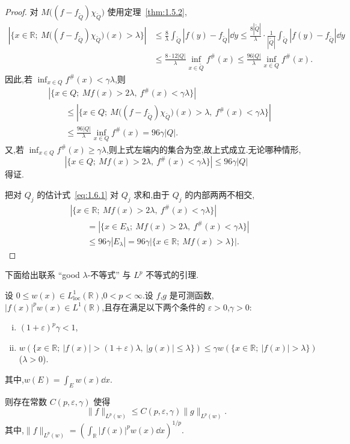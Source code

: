 \begin{proof}
对 $M\bigl((f - f_{\tilde{Q}})\chi_{\tilde{Q}}\bigr)$ 使用定理~\ref{thm:1.5.2},
\begin{align*}
|\{x \in \mathbb{R};\ M\bigl((f - f_{\tilde{Q}})\chi_{\tilde{Q}}\bigr)(x) > \lambda\}|&\leq \frac{8}{\lambda}\int_{\tilde{Q}}|f(y) - f_{\tilde{Q}}|\dd y \leq \frac{8|\tilde{Q}|}{\lambda}\cdot\frac{1}{|\tilde{Q}|}\int_{\tilde{Q}}|f(y) - f_{\tilde{Q}}|\dd y  \\
&\leq \frac{8\cdot 12|Q|}{\lambda}\inf_{x \in \tilde{Q}}f^{\#}(x) \leq \frac{96|Q|}{\lambda}\inf_{x \in Q}f^{\#}(x).
\end{align*}
因此,若 $\inf_{x \in Q}f^{\#}(x) < \gamma\lambda$,则
\begin{align*}
& |\{x \in Q;\ Mf(x) > 2\lambda,\ f^{\#}(x) < \gamma\lambda\}| \\
& \qquad \leq |\{x \in Q;\ M\bigl((f - f_{\tilde{Q}})\chi_{\tilde{Q}}\bigr)(x) > \lambda,\ f^{\#}(x) < \gamma\lambda\}| \\
& \qquad \leq \frac{96|Q|}{\lambda}\inf_{x \in Q}f^{\#}(x) = 96\gamma|Q|.
\end{align*}
又,若 $\inf_{x \in Q}f^{\#}(x) \geq \gamma\lambda$,则上式左端内的集合为空,故上式成立.无论哪种情形,
\begin{equation}\tag{1.6.1}
\left|\{x \in Q;\ Mf(x) > 2\lambda,\ f^{\#}(x) < \gamma\lambda\}\right| \leq 96\gamma|Q|
\label{eq:1.6.1}\end{equation}
得证.

把对 $Q_{j}$ 的估计式~\eqref{eq:1.6.1} 对 $Q_{j}$ 求和,由于 $Q_{j}$ 的内部两两不相交,
\begin{align*}
& |\{x \in \mathbb{R};\ Mf(x) > 2\lambda,\ f^{\#}(x) < \gamma\lambda\}| \\
& \qquad = |\{x \in E_{\lambda};\ Mf(x) > 2\lambda,\ f^{\#}(x) < \gamma\lambda\}| \\
& \qquad \leq 96\gamma|E_{\lambda}| = 96\gamma|\{x \in \mathbb{R};\ Mf(x) > \lambda\}|.
\end{align*}
\end{proof}

下面给出联系 ``good $\lambda$-不等式'' 与 $L^{p}$ 不等式的引理.

\begin{lemma}\label{lem:1.6.6}
设 $0 \leq w(x) \in L_{\mathrm{loc}}^{1}(\mathbb{R})$,$0 < p < \infty$.设 $f$,$g$ 是可测函数,$|f(x)|^{p}w(x) \in L^{1}(\mathbb{R})$,且存在满足以下两个条件的 $\varepsilon > 0$,$\gamma > 0$:
\begin{enumerate}[(i)]
\item $(1 + \varepsilon)^{p}\gamma < 1$,
\item $w(\{x \in \mathbb{R};\ |f(x)| > (1 + \varepsilon)\lambda,\ |g(x)| \leq \lambda\}) \leq \gamma w(\{x \in \mathbb{R};\ |f(x)| > \lambda\})$($\lambda > 0$).
\end{enumerate}
其中,$w(E) = \int_{E}w(x)\dd x$.

则存在常数 $C(p, \varepsilon, \gamma)$ 使得
\begin{equation*}
\| f \|_{L^{p}(w)} \leq C(p, \varepsilon, \gamma)\| g \|_{L^{p}(w)}.
\end{equation*}
其中,$\| f \|_{L^{p}(w)} = \left(\int_{\mathbb{R}}|f(x)|^{p}w(x)\dd x\right)^{1/p}$.
\end{lemma}

